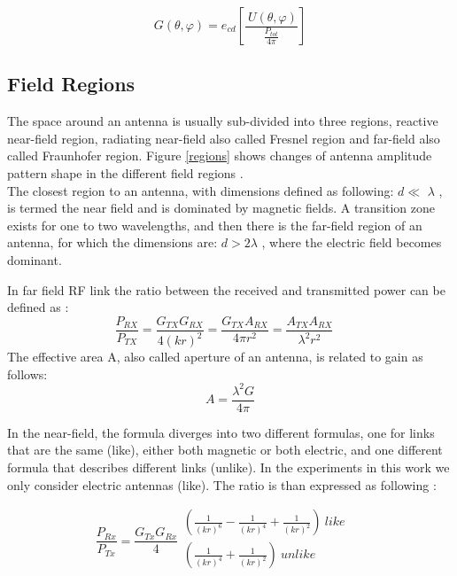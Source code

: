 \begin{equation}
G \left(  \theta , \varphi  \right) =e_{cd} \left[ \frac{~U \left(  \theta , \varphi  \right) }{\frac{P_{tot}}{4 \pi }} \right]
\end{equation}



\subsection{Field Regions}
The space around an antenna is usually sub-divided into three regions, reactive near-field region, radiating near-field also called Fresnel region and far-field also called Fraunhofer region. Figure \ref{regions} shows changes of antenna amplitude pattern shape in the different field regions \cite{schantz}. \\

The closest region to an antenna, with dimensions defined as following: $d \ll $ $ \lambda $  , is termed the near field and is dominated by magnetic fields. A transition zone exists for one to two wavelengths, and then there is the far-field region of an antenna, for which the dimensions are: $d>2\lambda $  , where the electric field becomes dominant.

In far field \acs{RF} link the ratio between the received and transmitted power can be defined as \cite{schantz}:
\begin{equation}
\frac{P_{RX}}{P_{TX}}=\frac{G_{TX}G_{RX}}{4 \left( kr \right) ^{2}}=\frac{G_{TX}A_{RX}}{4 \pi r^{2}}=\frac{A_{TX}A_{RX}}{ \lambda ^{2}r^{2}} \quad %
\end{equation}
The effective area A, also called aperture of an antenna, is related to gain as follows: 
\begin{equation}
A=\frac{ \lambda ^{2}G}{4 \pi }
\end{equation}

In the near-field, the formula diverges into two different formulas, one for links that are the same (like), either both magnetic or both electric, and one different formula that describes different links (unlike). In the experiments in this work we only consider electric antennas (like). The ratio is than expressed as following \cite{schantz}:

\begin{equation} \label{eq:near}
\frac{P_{Rx}}{P_{Tx}}=\frac{G_{Tx}G_{Rx}}{4} \begin{array}{c}
	 \left( \frac{1}{ \left( kr \right) ^{6}}-\frac{1}{ \left( kr \right) ^{4}}+\frac{1}{ \left( kr \right) ^{2}} \right) ~like~\\
	 \left( \frac{1}{ \left( kr \right) ^{4}}+\frac{1}{ \left( kr \right) ^{2}} \right) ~unlike\\
	\end{array} \quad %
\end{equation}

